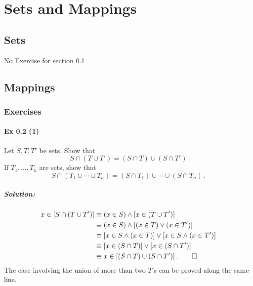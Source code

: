 \setcounter{chapter}{0}
\renewcommand{\thechapter}{0}
\chapter{Sets and Mappings}\label{ch:0}
\setcounter{equation}{0}	        %

\section{Sets}\label{sec:0.1}
No Exercise for section 0.1 

\section{Mappings}\label{sec:0.2}	
\subsection*{Exercises}\label{sec:0.2_Exercises}
%
\subsubsection{Ex 0.2 (1)}\label{sec:Ex_0.2.1}
Let $S, T, T'$ be sets. Show that
$$S \cap (T \cup T') = (S \cap T) \cup (S \cap T')$$
If $T_1,\ldots,T_n$ are sets, show that
$$S \cap (T_1 \cup \cdots \cup T_n) = (S \cap T_1) \cup \cdots \cup (S \cap T_n)\,.$$

\paragraph{Solution:}{
\begin{align*}
x \in \left[ S \cap (T \cup T') \right] &\equiv  (x \in S) \land [x \in (T \cup T')]\\
                                        &\equiv  (x \in S) \land [(x \in T) \lor (x \in T')] \\
                                        &\equiv  [x \in S \land (x \in T)] \lor [x \in S \land (x \in T')]\\
                                        &\equiv  [x \in (S \cap T)] \lor [x \in (S \cap T')]\\
                                        &\equiv  x \in [(S \cap T) \cup (S \cap T')]\,. \qed
\end{align*}
The case involving the union of more than two $T$'s can be proved along the same line.
}	%

